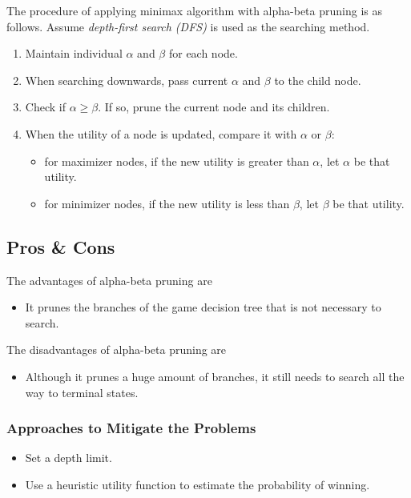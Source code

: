 \documentclass{note}
\begin{document}
The procedure of applying minimax algorithm with alpha-beta pruning is as follows. Assume \textit{depth-first search (DFS)} is used as the searching method.

\begin{enumerate}
    \item Maintain individual $\alpha$ and $\beta$ for each node.
    \item When searching downwards, pass current $\alpha$ and $\beta$ to the child node.
    \item Check if $\alpha \ge \beta$. If so, prune the current node and its children.
    \item When the utility of a node is updated, compare it with $\alpha$ or $\beta$: 
    \begin{itemize}
        \item for maximizer nodes, if the new utility is greater than $\alpha$, let $\alpha$ be that utility. 
        \item for minimizer nodes, if the new utility is less than $\beta$, let $\beta$ be that utility. 
    \end{itemize}
\end{enumerate}

\subsection{Pros \& Cons}

The advantages of alpha-beta pruning are
\begin{itemize}
    \item It prunes the branches of the game decision tree that is not necessary to search.
\end{itemize}

The disadvantages of alpha-beta pruning are
\begin{itemize}
    \item Although it prunes a huge amount of branches, it still needs to search all the way to terminal states.
\end{itemize}

\subsubsection{Approaches to Mitigate the Problems}
\begin{itemize}
    \item Set a depth limit.
    \item Use a heuristic utility function to estimate the probability of winning.
\end{itemize}
\end{document}
